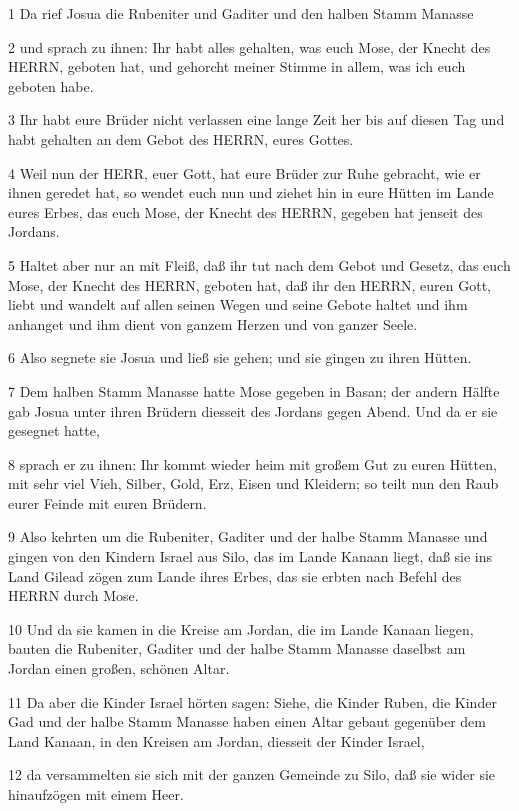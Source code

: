 \par 1 Da rief Josua die Rubeniter und Gaditer und den halben Stamm Manasse
\par 2 und sprach zu ihnen: Ihr habt alles gehalten, was euch Mose, der Knecht des HERRN, geboten hat, und gehorcht meiner Stimme in allem, was ich euch geboten habe.
\par 3 Ihr habt eure Brüder nicht verlassen eine lange Zeit her bis auf diesen Tag und habt gehalten an dem Gebot des HERRN, eures Gottes.
\par 4 Weil nun der HERR, euer Gott, hat eure Brüder zur Ruhe gebracht, wie er ihnen geredet hat, so wendet euch nun und ziehet hin in eure Hütten im Lande eures Erbes, das euch Mose, der Knecht des HERRN, gegeben hat jenseit des Jordans.
\par 5 Haltet aber nur an mit Fleiß, daß ihr tut nach dem Gebot und Gesetz, das euch Mose, der Knecht des HERRN, geboten hat, daß ihr den HERRN, euren Gott, liebt und wandelt auf allen seinen Wegen und seine Gebote haltet und ihm anhanget und ihm dient von ganzem Herzen und von ganzer Seele.
\par 6 Also segnete sie Josua und ließ sie gehen; und sie gingen zu ihren Hütten.
\par 7 Dem halben Stamm Manasse hatte Mose gegeben in Basan; der andern Hälfte gab Josua unter ihren Brüdern diesseit des Jordans gegen Abend. Und da er sie gesegnet hatte,
\par 8 sprach er zu ihnen: Ihr kommt wieder heim mit großem Gut zu euren Hütten, mit sehr viel Vieh, Silber, Gold, Erz, Eisen und Kleidern; so teilt nun den Raub eurer Feinde mit euren Brüdern.
\par 9 Also kehrten um die Rubeniter, Gaditer und der halbe Stamm Manasse und gingen von den Kindern Israel aus Silo, das im Lande Kanaan liegt, daß sie ins Land Gilead zögen zum Lande ihres Erbes, das sie erbten nach Befehl des HERRN durch Mose.
\par 10 Und da sie kamen in die Kreise am Jordan, die im Lande Kanaan liegen, bauten die Rubeniter, Gaditer und der halbe Stamm Manasse daselbst am Jordan einen großen, schönen Altar.
\par 11 Da aber die Kinder Israel hörten sagen: Siehe, die Kinder Ruben, die Kinder Gad und der halbe Stamm Manasse haben einen Altar gebaut gegenüber dem Land Kanaan, in den Kreisen am Jordan, diesseit der Kinder Israel,
\par 12 da versammelten sie sich mit der ganzen Gemeinde zu Silo, daß sie wider sie hinaufzögen mit einem Heer.
